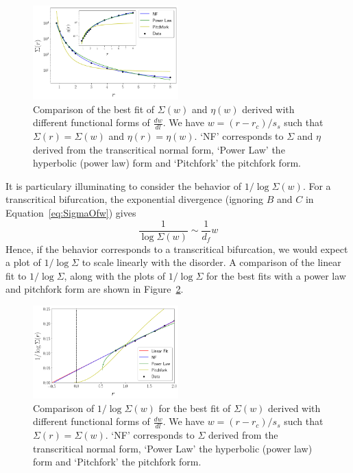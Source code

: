 \documentclass[reprint,amsmath,amssymb,aps,floatfix, prl]{revtex4-1}
\begin{document}
\begin{figure}
		\includegraphics[width=0.5\textwidth]{comparison.png}
		\caption{ Comparison of the best fit of $\Sigma(w)$ and $\eta(w)$ derived with different functional forms of $\frac{dw}{dl}$. We have $w=(r-r_c)/s_s$ such that $\Sigma(r)=\Sigma(w)$ and $\eta(r)=\eta(w)$. `NF' corresponds to $\Sigma$ and $\eta$ derived from the transcritical normal form, `Power Law' the hyperbolic (power law) form and `Pitchfork' the pitchfork form.}
		\label{fig:comparison}
\end{figure}
%
It is particulary illuminating to consider the behavior of $1/\log\Sigma(w)$. For a transcritical bifurcation, the exponential divergence (ignoring $B$ and $C$ in Equation~\ref{eq:SigmaOfw}) gives
%
\begin{equation}
	\frac{1}{\log\Sigma(w)} \sim \frac{1}{d_f} w
\end{equation}
%
\noindent Hence, if the behavior corresponds to a transcritical bifurcation, we would expect a plot of $1/\log\Sigma$ to scale linearly with the disorder. A comparison of the linear fit to $1/\log\Sigma$, along with the plots of $1/\log\Sigma$ for the best fits with a power law and pitchfork form are shown in Figure~\ref{fig:logplot}.
%
\begin{figure}
		\includegraphics[width=0.5\textwidth]{logplot.png}
		\caption{Comparison of $1/\log\Sigma(w)$ for the best fit of $\Sigma(w)$ derived with different functional forms of $\frac{dw}{dl}$. We have $w=(r-r_c)/s_s$ such that $\Sigma(r)=\Sigma(w)$. `NF' corresponds to $\Sigma$ derived from the transcritical normal form, `Power Law' the hyperbolic (power law) form and `Pitchfork' the pitchfork form.}
		\label{fig:logplot}
\end{figure}
\end{document}
